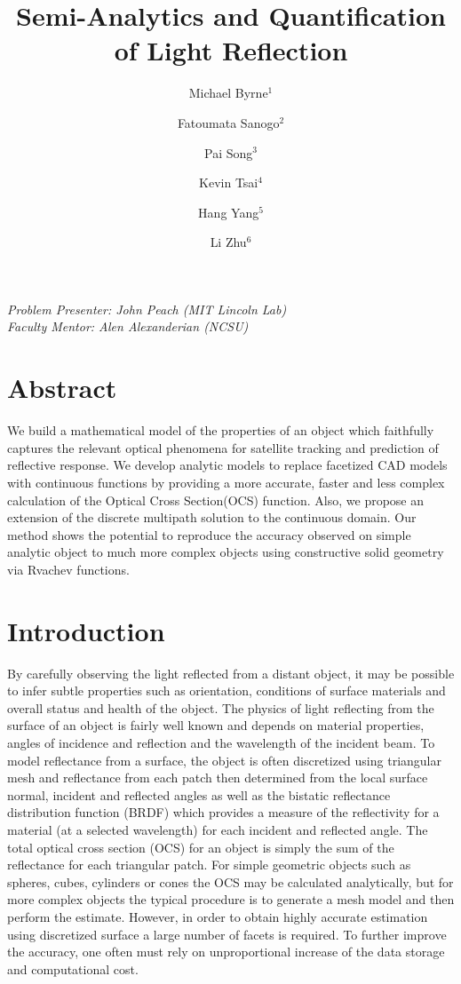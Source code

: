 \documentclass[11pt]{amsart}
\author{Michael Byrne$^1$}
\author{Fatoumata Sanogo$^2$}
\author{Pai Song$^3$}
\author{Kevin Tsai$^4$}
\author{Hang Yang$^5$}
\author{Li Zhu$^6$}
\title{Semi-Analytics and Quantification of Light Reflection}
\theoremstyle{definition}
\begin{document}
\maketitle
{\noindent
\textit{Problem Presenter:  John Peach (MIT Lincoln Lab)\\
Faculty Mentor: Alen Alexanderian (NCSU)}}

\tableofcontents

\section{Abstract}

We build a mathematical model of the properties of an object which faithfully captures the relevant optical phenomena for satellite tracking and prediction of reflective response. We develop analytic models to replace facetized CAD models with continuous functions by providing a more accurate, faster and less complex calculation of the Optical Cross Section(OCS) function. Also, we propose an extension of the discrete multipath solution to the continuous domain. Our method shows the potential to reproduce the accuracy observed on simple analytic object to much more complex objects using constructive solid geometry via Rvachev functions.

\section{Introduction}
By carefully observing the light reflected from a distant object, it may be possible to infer subtle properties such as
orientation, conditions of surface materials and overall status and health of the object. The physics of light reflecting from
the surface of an object is fairly well known and depends on material properties, angles of incidence and reflection and the
wavelength of the incident beam. To model reflectance from a surface, the object is often discretized using triangular mesh
and reflectance from each patch then determined from the local surface normal, incident and reflected angles as well as the
bistatic reflectance distribution function (BRDF) which provides a measure of the reflectivity for a material (at a selected
wavelength) for each incident and reflected angle.
The total optical cross section (OCS) for an object is simply the sum of the reflectance for each triangular patch. For
simple geometric objects such as spheres, cubes, cylinders or cones the OCS may be calculated analytically, but for more
complex objects the typical procedure is to generate a mesh model and then perform the estimate. However, in order to obtain highly accurate estimation using discretized surface a large number of facets is required. To further improve the accuracy, one often must rely on unproportional increase of the data storage and computational cost. 
\end{document}
